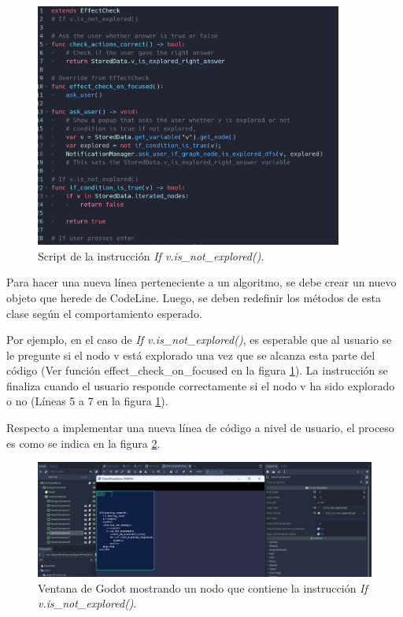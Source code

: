 \begin{figure}[h!]
	\centering
	\includegraphics[width=0.9\textwidth]{imagenes/v_is_not_explored_effect_check_1.png}
	\caption{Script de la instrucción \emph{If v.is\_not\_explored()}.}
	\label{v_is_not_explored_effect_check}
\end{figure}



Para hacer una nueva línea perteneciente a un algoritmo, se debe crear un nuevo objeto que herede de CodeLine. Luego, se deben redefinir los métodos de esta clase según el comportamiento esperado. 

Por ejemplo, en el caso de \emph{If v.is\_not\_explored()}, es esperable que al usuario se le pregunte si el nodo v está explorado una vez que se alcanza esta parte del código (Ver función effect\_check\_on\_focused en la figura \ref{v_is_not_explored_effect_check}). La instrucción se finaliza cuando el usuario responde correctamente si el nodo v ha sido explorado o no (Líneas 5 a 7 en la figura \ref{v_is_not_explored_effect_check}).

Respecto a implementar una nueva línea de código a nivel de usuario, el proceso es como se indica en la figura \ref{Godot_v_is_not_explored}. 

\begin{figure}[h!]
	\centering
	\includegraphics[width=1.2\textwidth]{imagenes/DFS_if_v_is_not_explored.png}
	\caption{Ventana de Godot mostrando un nodo que contiene la instrucción \emph{If v.is\_not\_explored()}.}
	\label{Godot_v_is_not_explored}
\end{figure}


